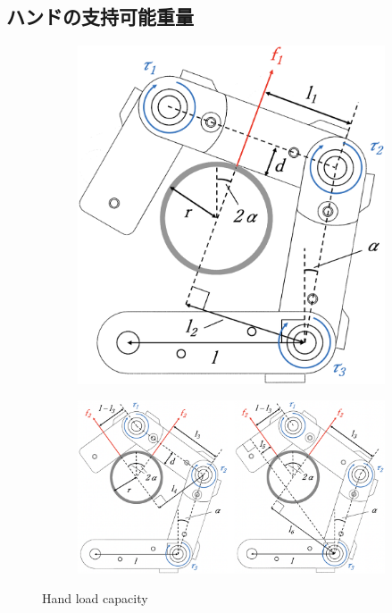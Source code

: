 \documentclass{jarticle}
\begin{document}
\subsection{ハンドの支持可能重量}
\vspace{-2mm}
\begin{figure}[h]
  \centering
  \begin{subfigure}{0.3\columnwidth}
    \includegraphics[width=\textwidth]{figs/weight1.eps}
    \caption{}
    \label{fig:pgimage}
  \end{subfigure}
  \begin{subfigure}{0.6\columnwidth}
    \includegraphics[width=\textwidth]{figs/weight2.eps}
    \caption{}
    \label{fig:pgimage}
  \end{subfigure}
  \vspace{2mm}
  \caption{Hand load capacity}
  \vspace{-3mm}
\end{figure}
\end{document}
